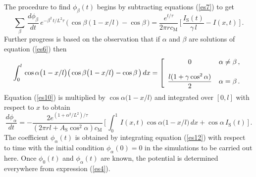 The procedure to find $\phi_\beta(t)$ begins by subtracting
equations (\ref{es7}) to get
\begin{equation}\label{es10}
\sum_\beta\,\frac{d\phi_\beta}{dt}
\,e^{-\beta^2\,t/L^2\tau}\,\Big(\,\cos{\beta(1-x/l)}
-\cos\beta\,\Big) = \frac{e^{t/\tau}}{2\pi r c_\mathrm{M}}
\,\Big[\,\frac{I_\mathrm{S}(t)}{\gamma\,l}-I(x,t)\,\Big]\,.
\end{equation}
Further progress is based on the observation that if $\alpha$ and
$\beta$ are solutions of equation (\ref{es6}) then
\begin{equation}\label{es11}
\int_0^l\,\cos\alpha\big(1-x/l\big)\big(\cos\beta\big(1-x/l\big)
-\cos\beta\,\big)\,dx=
\left[\begin{array}{cc}
0 & \alpha\ne\beta\,, \\[10pt]
\displaystyle\frac{l(1+\gamma\cos^2\alpha)}{2} & \alpha=\beta\,.
\end{array}\right.
\end{equation}
Equation (\ref{es10}) is multiplied by $\cos\alpha\big(1-x/l\big)$
and integrated over $[0,l]$ with respect to $x$ to obtain
\begin{equation}\label{es12}
\frac{d\phi_\alpha}{dt}=-\frac{2e^{(1+\alpha^2/L^2)/\tau}}
{(2\pi r l+A_\mathrm{S}\cos^2\alpha)c_\mathrm{M}}\,\Big[\,
\int_0^1\,I(x,t)\cos\alpha\big(1-x/l\big)\,dx
+\cos\alpha\,I_\mathrm{S}(t)\,\Big]\,.
\end{equation}
The coefficient $\phi_\alpha(t)$ is obtained by integrating
equation (\ref{es12}) with respect to time with the initial
condition $\phi_\alpha(0)=0$ in the simulations to be carried out
here. Once $\phi_0(t)$ and $\phi_\alpha(t)$ are known, the
potential is determined everywhere from expression (\ref{es4}).

